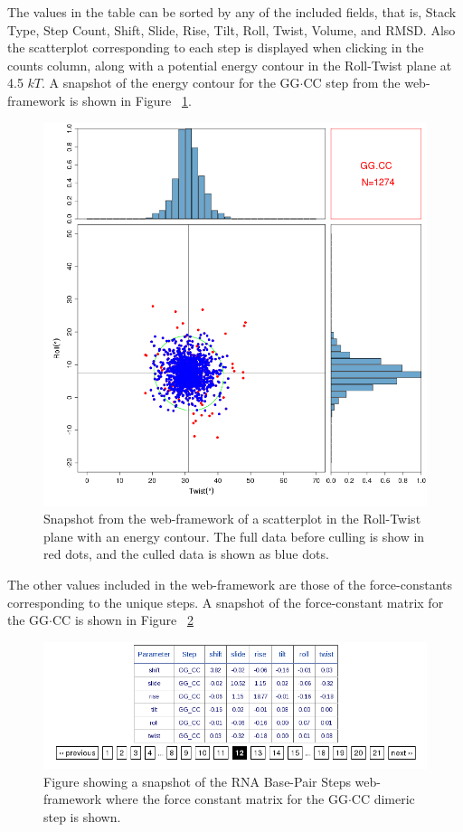 The values in  the table can be sorted by any  of the included fields,
that  is, Stack  Type, Step  Count,  Shift, Slide,  Rise, Tilt,  Roll,
Twist, Volume,  and RMSD. Also  the scatterplot corresponding  to each
step is  displayed when  clicking in the  counts column, along  with a
potential  energy contour  in  the  Roll-Twist plane  at  4.5 $kT$.  A
snapshot  of the  energy contour  for  the GG$\cdot$CC  step from  the
web-framework is shown in Figure ~\ref{fig:contour}.
\begin{figure}[htbp]
\centering
\includegraphics[angle=0, scale=0.4]{Chapter4/contour.png}
\caption{Snapshot from the web-framework of a scatterplot in the
  Roll-Twist plane with an energy contour. The full data before
  culling is show in red dots, and the culled data is shown as blue dots.} 
\label{fig:contour}
\end{figure}

The  other values  included  in  the web-framework  are  those of  the
force-constants corresponding  to the unique steps. A  snapshot of the
force-constant  matrix   for  the  GG$\cdot$CC  is   shown  in  Figure
~\ref{fig:forceconst}

\begin{figure}[htbp]
\centering
\includegraphics[angle=0, scale=0.6]{Chapter4/forceconst.png}
\caption{Figure showing a snapshot of the RNA Base-Pair Steps
  web-framework where the force constant matrix for the GG$\cdot$CC dimeric
  step is shown.}
\label{fig:forceconst}
\end{figure}  

